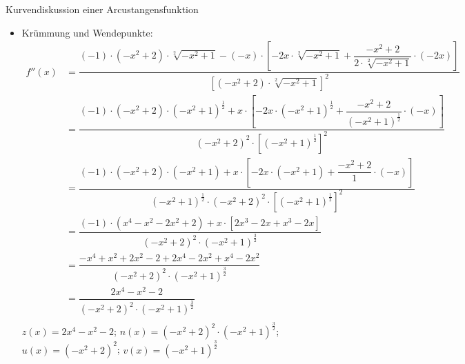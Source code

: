 \begin{Example}{Kurvendiskussion einer Arcustangensfunktion}{}
\begin{itemize}
{{\begin{itemize}
{                    }
                \item Hochpunkte: \\[1.0ex]{
                    $H_{1}\left(0 / \frac{\pi}{4}\right)$
                }
            \end{itemize}
        }
        }
    \item Krümmung und Wendepunkte: \\[-2.0ex]{
        \begin{align*}
            f''(x) &= \dfrac{\left(-1\right) \cdot \left(-x^{2} + 2\right) \cdot \sqrt[2]{-x^{2} + 1} - \left(-x\right) \cdot \left[-2x \cdot \sqrt[2]{-x^{2} + 1} + \dfrac{-x^{2} + 2}{2 \cdot \sqrt[2]{-x^{2} + 1}} \cdot \left(-2x\right)\right]}{\left[\left(-x^{2} + 2\right) \cdot \sqrt[2]{-x^{2} + 1}\right]^{2}} &&\\[2.0ex]
            &= \dfrac{\left(-1\right) \cdot \left(-x^{2} + 2\right) \cdot \left(-x^{2} + 1\right)^{\frac{1}{2}} + x \cdot \left[-2x \cdot \left(-x^{2} + 1\right)^{\frac{1}{2}} + \dfrac{-x^{2} + 2}{\left(-x^{2} + 1\right)^{\frac{1}{2}}} \cdot \left(-x\right)\right]}{\left(-x^{2} + 2\right)^{2} \cdot \left[\left(-x^{2} + 1\right)^{\frac{1}{2}}\right]^{2}} &&\\[2.0ex]
            &= \dfrac{\left(-1\right) \cdot \left(-x^{2} + 2\right) \cdot \left(-x^{2} + 1\right) + x \cdot \left[-2x \cdot \left(-x^{2} + 1\right) + \dfrac{-x^{2} + 2}{1} \cdot \left(-x\right)\right]}{\left(-x^{2} + 1\right)^{\frac{1}{2}} \cdot \left(-x^{2} + 2\right)^{2} \cdot \left[\left(-x^{2} + 1\right)^{\frac{1}{2}}\right]^{2}} &&\\[2.0ex]
            &= \dfrac{\left(-1\right) \cdot \left(x^{4} - x^{2} - 2x^{2} +2\right) + x \cdot \left[2x^{3} - 2x + x^{3} - 2x\right]}{\left(-x^{2} + 2\right)^{2} \cdot \left(-x^{2} + 1\right)^{\frac{3}{2}}} &&\\[2.0ex]
            &= \dfrac{-x^{4} + x^{2} + 2x^{2} -2 + 2x^{4} - 2x^{2} + x^{4} - 2x^{2}}{\left(-x^{2} + 2\right)^{2} \cdot \left(-x^{2} + 1\right)^{\frac{3}{2}}} &&\\[2.0ex]
            &= \dfrac{2x^{4}-x^{2}-2}{\left(-x^{2} + 2\right)^{2} \cdot \left(-x^{2} + 1\right)^{\frac{3}{2}}} && \\[-2.0ex]
        \end{align*}
        }
        $z(x) = 2x^{4}-x^{2}-2$; \qquad $n(x) = \left(-x^{2} + 2\right)^{2} \cdot \left(-x^{2} + 1\right)^{\frac{3}{2}}$; \\[2.0ex]
        $u(x) = \left(-x^{2} + 2\right)^{2}$; \qquad $v(x) = \left(-x^{2} + 1\right)^{\frac{3}{2}}$\\[2.0ex]

\end{itemize}
\end{Example}
